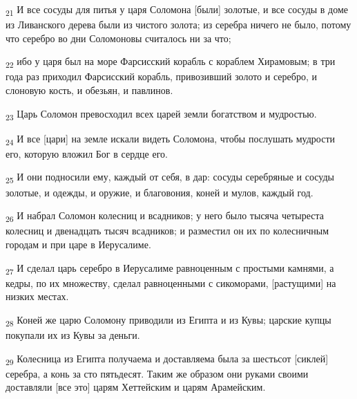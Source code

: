 \begin{tcolorbox}
\textsubscript{21} И все сосуды для питья у царя Соломона [были] золотые, и все сосуды в доме из Ливанского дерева были из чистого золота; из серебра ничего не было, потому что серебро во дни Соломоновы считалось ни за что;
\end{tcolorbox}
\begin{tcolorbox}
\textsubscript{22} ибо у царя был на море Фарсисский корабль с кораблем Хирамовым; в три года раз приходил Фарсисский корабль, привозивший золото и серебро, и слоновую кость, и обезьян, и павлинов.
\end{tcolorbox}
\begin{tcolorbox}
\textsubscript{23} Царь Соломон превосходил всех царей земли богатством и мудростью.
\end{tcolorbox}
\begin{tcolorbox}
\textsubscript{24} И все [цари] на земле искали видеть Соломона, чтобы послушать мудрости его, которую вложил Бог в сердце его.
\end{tcolorbox}
\begin{tcolorbox}
\textsubscript{25} И они подносили ему, каждый от себя, в дар: сосуды серебряные и сосуды золотые, и одежды, и оружие, и благовония, коней и мулов, каждый год.
\end{tcolorbox}
\begin{tcolorbox}
\textsubscript{26} И набрал Соломон колесниц и всадников; у него было тысяча четыреста колесниц и двенадцать тысяч всадников; и разместил он их по колесничным городам и при царе в Иерусалиме.
\end{tcolorbox}
\begin{tcolorbox}
\textsubscript{27} И сделал царь серебро в Иерусалиме равноценным с простыми камнями, а кедры, по их множеству, сделал равноценными с сикоморами, [растущими] на низких местах.
\end{tcolorbox}
\begin{tcolorbox}
\textsubscript{28} Коней же царю Соломону приводили из Египта и из Кувы; царские купцы покупали их из Кувы за деньги.
\end{tcolorbox}
\begin{tcolorbox}
\textsubscript{29} Колесница из Египта получаема и доставляема была за шестьсот [сиклей] серебра, а конь за сто пятьдесят. Таким же образом они руками своими доставляли [все это] царям Хеттейским и царям Арамейским.
\end{tcolorbox}
